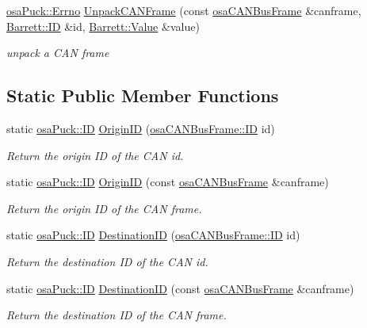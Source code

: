 \begin{DoxyCompactItemize}
\item 
\hyperlink{classosa_puck_af19c88d20083577d3a676353b4902391}{osa\+Puck\+::\+Errno} \hyperlink{classosa_puck_a87860770046d3d0ee0fe13ec41cab8bc}{Unpack\+C\+A\+N\+Frame} (const \hyperlink{classosa_c_a_n_bus_frame}{osa\+C\+A\+N\+Bus\+Frame} \&canframe, \hyperlink{struct_barrett_a317dfaed9982ffc28166e537d774bd16}{Barrett\+::\+I\+D} \&id, \hyperlink{struct_barrett_a57ff132885344ca62e4b4b691885685b}{Barrett\+::\+Value} \&value)
\begin{DoxyCompactList}\small\item\em unpack a C\+A\+N frame \end{DoxyCompactList}\end{DoxyCompactItemize}
\subsection*{Static Public Member Functions}
\begin{DoxyCompactItemize}
\item 
static \hyperlink{classosa_puck_aa484456bae759574accdc76fe68b4685}{osa\+Puck\+::\+I\+D} \hyperlink{classosa_puck_abe31686faa78be6b3feae03712c2cb58}{Origin\+I\+D} (\hyperlink{classosa_c_a_n_bus_frame_ae917bcfe6427b2055a405716909c6048}{osa\+C\+A\+N\+Bus\+Frame\+::\+I\+D} id)
\begin{DoxyCompactList}\small\item\em Return the origin I\+D of the C\+A\+N id. \end{DoxyCompactList}\item 
static \hyperlink{classosa_puck_aa484456bae759574accdc76fe68b4685}{osa\+Puck\+::\+I\+D} \hyperlink{classosa_puck_a4fd0113b6e5222c6b43f3aa6746542c2}{Origin\+I\+D} (const \hyperlink{classosa_c_a_n_bus_frame}{osa\+C\+A\+N\+Bus\+Frame} \&canframe)
\begin{DoxyCompactList}\small\item\em Return the origin I\+D of the C\+A\+N frame. \end{DoxyCompactList}\item 
static \hyperlink{classosa_puck_aa484456bae759574accdc76fe68b4685}{osa\+Puck\+::\+I\+D} \hyperlink{classosa_puck_a31ee245d345346ed269a228bf4c92219}{Destination\+I\+D} (\hyperlink{classosa_c_a_n_bus_frame_ae917bcfe6427b2055a405716909c6048}{osa\+C\+A\+N\+Bus\+Frame\+::\+I\+D} id)
\begin{DoxyCompactList}\small\item\em Return the destination I\+D of the C\+A\+N id. \end{DoxyCompactList}\item 
static \hyperlink{classosa_puck_aa484456bae759574accdc76fe68b4685}{osa\+Puck\+::\+I\+D} \hyperlink{classosa_puck_a33bc71ae2ae1b842f6f137da93be2410}{Destination\+I\+D} (const \hyperlink{classosa_c_a_n_bus_frame}{osa\+C\+A\+N\+Bus\+Frame} \&canframe)
\begin{DoxyCompactList}\small\item\em Return the destination I\+D of the C\+A\+N frame. \end{DoxyCompactList}\end{DoxyCompactItemize}
